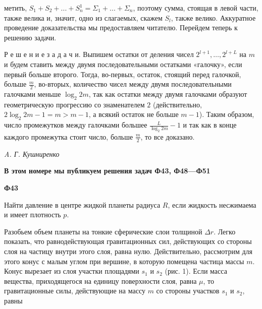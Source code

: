 \noindent метить, \( S_1 + S_2 + . . . + S_n^1 = \Sigma_1 + . . . + \Sigma_n \), поэтому сумма, стоящая в левой части, также велика и, значит, одно из слагаемых, скажем \( S_l \), также велико. Аккуратное проведение доказательства мы предоставляем читателю. Перейдем теперь к решению задачи.

Р е ш е н и е \quad з а д а ч и. \quad Выпишем остатки от деления чисел \( 2^{l+1}, \dots , 2^{l+L} \) на \( m \) и будем ставить между двумя последовательными остатками «галочку», если первый больше второго. Тогда, во-первых, остаток, стоящий перед галочкой, больше \( \frac{m}{2} \), во-вторых, количество чисел между двумя последовательными галочками меньше \( \log_2 2m \), так как остатки между двумя галочками образуют геометрическую прогрессию со знаменателем \( 2 \) (действительно, \( 2\log_2 2m - 1=m > m-1 \), а всякий остаток не больше \( m-1 \)). Таким образом, число промежутков между галочками большее \( \frac{L}{\log_2 2m} - 1 \) и так как в конце каждого промежутка стоит число, больше \( \frac{m}{2} \), то все доказано.

\begin{flushright} \textsl{A. Г. Кушниренко} \end{flushright}

\vspace{0.5cm}

\textbf{В этом номере мы публикуем решения задач Ф43, Ф48—Ф51}

\begin{center} \textbf{Ф43} \end{center}

\begin{small} Найти давление в центре жидкой планеты радиуса \( R \), если жидкость несжимаема и имеет плотность \( p \). \end{small}

\vspace{0.2cm}

Разобьем объем планеты на тонкие сферические слои толщиной \( \Delta r \). Легко показать, что равнодействующая гравитационных сил, действующих со стороны слоя на частицу внутри этого слоя, равна нулю. Действительно, рассмотрим для этого конус с малым углом при вершине, в которую помещена частица массы \( m \). Конус вырезает из слоя участки площадями \( s_1 \) и \( s_2 \) (рис. 1). Если масса вещества, приходящегося на единицу поверхности слоя, равна \( \mu \), то гравитационные силы, действующие на массу \( m \) со стороны участков \( s_1 \) и \( s_2 \), равны

